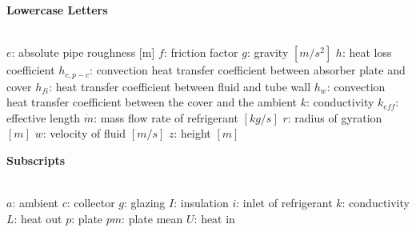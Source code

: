 \documentclass{ucalgarythesis}
\begin{document}
\textbf{Lowercase Letters}
\vspace{-7mm}
\begin{tabbing}
    \textbf{ }\=\\
    \addsymbol \mbox{$e$}: {absolute pipe roughness [m]}
    \addsymbol \mbox{$f$}: {friction factor}
    \addsymbol \mbox{$g$}: {gravity $[m/s^2]$}
    \addsymbol \mbox{$h$}: {heat loss coefficient}
    \addsymbol \mbox{$h_{c,p-c}$}: {convection heat transfer coefficient between absorber plate and cover}
    \addsymbol \mbox{$h_{fi}$}: {heat transfer coefficient between fluid and tube wall}
    \addsymbol \mbox{$h_{w}$}: {convection heat transfer coefficient between the cover and the ambient}
    \addsymbol \mbox{$k$}: {conductivity}
    \addsymbol \mbox{$k_{eff}$}: {effective length}
    \addsymbol \mbox{$\dot m$}: {mass flow rate of refrigerant $[kg/s]$}
    \addsymbol \mbox{$r$}: {radius of gyration $[m]$}
    \addsymbol \mbox{$w$}: {velocity of fluid $[m/s]$}
    \addsymbol \mbox{$z$}: {height $[m]$}
\end{tabbing}
\vspace{-3mm}

\textbf{Subscripts}
\vspace{-7mm}
\begin{tabbing}
    \textbf{ }\=\\
    \addsymbol \mbox{$a$}: {ambient}
    \addsymbol \mbox{$c$}: {collector }
    \addsymbol \mbox{$g$}: {glazing}
    \addsymbol \mbox{$I$}: {insulation}
    \addsymbol \mbox{$i$}: {inlet of refrigerant}
    \addsymbol \mbox{$k$}: {conductivity}
    \addsymbol \mbox{$L$}: {heat out}
    \addsymbol \mbox{$p$}: {plate}
    \addsymbol \mbox{$pm$}: {plate mean}
    \addsymbol \mbox{$U$}: {heat in}
\end{tabbing}
\newpage


\mainmatter







%


\thesisbibliography
\end{document}
